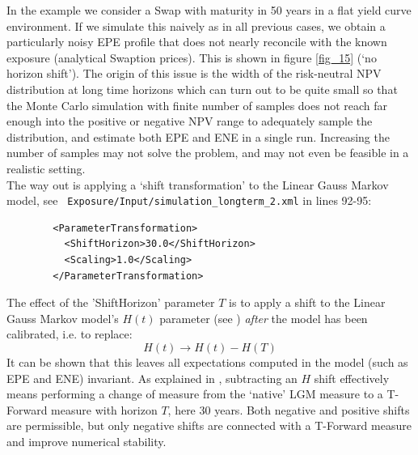 In the example we consider a Swap with maturity in 50 years in a flat yield curve environment. If we simulate this
naively as in all previous cases, we obtain a particularly noisy EPE profile that does not nearly reconcile with the
known exposure (analytical Swaption prices). This is shown in figure \ref{fig_15} (`no horizon shift'). The origin of
this issue is the width of the risk-neutral NPV distribution at long time horizons which can turn out to be quite small
so that the Monte Carlo simulation with finite number of samples does not reach far enough into the positive or negative
NPV range to adequately sample the distribution, and estimate both EPE and ENE in a single run.  Increasing the number
of samples may not solve the problem, and may not even be feasible in a realistic setting. \\

The way out is applying a `shift transformation' to the Linear Gauss Markov model, see {\tt
  Exposure/Input/simulation\_longterm\_2.xml} in lines 92-95:
\begin{listing}[H]
\begin{verbatim}
        <ParameterTransformation>
          <ShiftHorizon>30.0</ShiftHorizon>
          <Scaling>1.0</Scaling>
        </ParameterTransformation>
\end{verbatim}
\end{listing}

The effect of the 'ShiftHorizon' parameter $T$ is to apply a shift to the Linear Gauss Markov model's $H(t)$ parameter
(see \cite{methods}) {\em after} the model has been calibrated, i.e. to replace:
$$
H(t) \rightarrow H(t) - H(T)
$$
It can be shown that this leaves all expectations computed in the model (such as EPE and ENE) invariant. As explained in
\cite{Lichters}, subtracting an $H$ shift effectively means performing a change of measure from the `native' LGM measure
to a T-Forward measure with horizon $T$, here 30 years. Both negative and positive shifts are permissible, but only
negative shifts are connected with a T-Forward measure and improve numerical stability. \\

